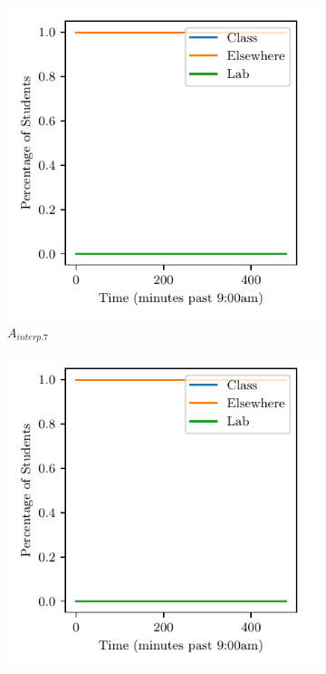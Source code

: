 \documentclass[11pt]{amsart}
\begin{document}
\begin{figure}[htp]
    \hfill
    \begin{subfigure}[b]{0.32\textwidth}
        \includegraphics[width=\textwidth]{temp.pdf}
        \caption{$A_{interp.7}$}
        \label{fig:interp_degrees_7}
    \end{subfigure}
    \hfill
    \begin{subfigure}[b]{0.32\textwidth}
        \includegraphics[width=\textwidth]{temp.pdf}

\end{subfigure}
\end{figure}
\end{document}
